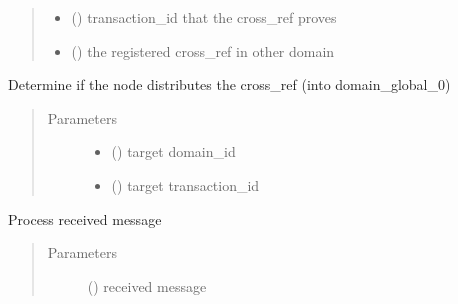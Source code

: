 \documentclass[letterpaper,10pt,english]{sphinxmanual}
\begin{document}
\begin{fulllineitems}
\begin{fulllineitems}
\begin{quote}
\begin{description}
\begin{itemize}
\item {} 
 () \textendash{} transaction\_id that the cross\_ref proves

\item {} 
 () \textendash{} the registered cross\_ref in other domain

\end{itemize}

\end{description}\end{quote}

\end{fulllineitems}


\begin{fulllineitems}
\label{\detokenize{bbc1.core.domain0_manager:bbc1.core.domain0_manager.Domain0Manager.distribute_cross_ref_in_domain0}}
Determine if the node distributes the cross\_ref (into domain\_global\_0)
\begin{quote}\begin{description}
\item[{Parameters}] \leavevmode\begin{itemize}
\item {} 
 () \textendash{} target domain\_id

\item {} 
 () \textendash{} target transaction\_id

\end{itemize}

\end{description}\end{quote}

\end{fulllineitems}


\begin{fulllineitems}
\label{\detokenize{bbc1.core.domain0_manager:bbc1.core.domain0_manager.Domain0Manager.process_message}}
Process received message
\begin{quote}\begin{description}
\item[{Parameters}] \leavevmode
{} () \textendash{} received message


\end{description}
\end{quote}
\end{fulllineitems}
\end{fulllineitems}
\end{document}
